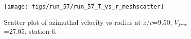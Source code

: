 \begin{figure}[H]
\centering
\texttt{[image: figs/run\_57/run\_57\_T\_vs\_r\_meshscatter]}
\caption{Scatter plot of azimuthal velocity vs radius at $z/c$=9.50, $V_{free}$=27.05, station 6.}
\label{fig:run_57_T_vs_r_meshscatter}
\end{figure}


